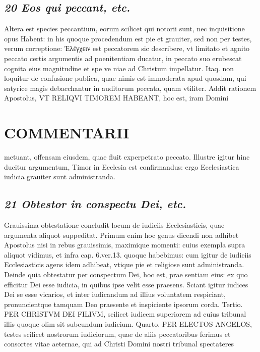 \documentclass{article}
\begin{document}
\begin{pages}
\subsection*{\textit{20 Eos qui peccant, etc. }}\pstart Altera est species peccantium, eorum scilicet qui notorii sunt, nec inquisitione opus Habent: in his quoque procedendum est pie et grauiter, sed non per testes, verum correptione: Ἐλέγχειν est peccatorem sic describere, vt limitato et agnito peccato certis argumentis ad poenitentiam ducatur, in peccato suo erubescat cognita eius magnitudine et spe ve niae ad Christum impellatur. Itaq. non loquitur de confusione publica, quae nimis est immoderata apud quosdam, qui satyrice magis debacchantur in auditorum peccata, quam vtiliter. Addit rationem Apostolus, VT RELIQVI TIMOREM HABEANT, hoc est, iram Domini  \pend
\section*{COMMENTARII }
\marginpar{[ p.136 ]}\pstart metuant, offensam eiusdem, quae fluit experpetrato peccato. Illustre igitur hinc ducitur argumentum, Timor in Ecclesia est confirmandus: ergo Ecclesiastica iudicia grauiter sunt administranda.  \pend
{}
{}
\subsection*{\textit{21 Obtestor in conspectu Dei, etc. }}\pstart Grauissima obtestatione concludit locum de iudiciis Ecclesiasticis, quae argumenta aliquot suppeditat. Primum enim hoc genus dicendi non adhibet Apostolus nisi in rebus grauissimis, maximique momenti: cuius exempla supra aliquot vidimus, et infra cap. 6.ver.13. quoque habebimus: cum igitur de iudiciis Ecclesiasticis agens idem adhibeat, vtique pie et religiose sunt administranda. Deinde quia obtestatur per conspectum Dei, hoc est, prae sentiam eius: ex quo efficitur Dei esse iudicia, in quibus ipse velit esse praesens.  \pend\pstart Sciant igitur iudices Dei se esse vicarios, et inter iudicandum ad illius voluntatem respiciant, pronuncientque tamquam Deo praesente et inspiciente ipsorum corda. Tertio. PER CHRISTVM DEI FILIVM, scilicet iudicem superiorem ad cuius tribunal illis quoque olim sit subeundum iudicium. Quarto. PER ELECTOS ANGELOS, testes scilicet nostrorum iudiciorum, quae de aliis peccatoribus ferimus et consortes vitae aeternae, qui ad Christi Domini nostri tribunal spectateres  \pend

\end{pages}
\end{document}
